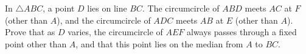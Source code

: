 In $\triangle ABC$, a point $D$ lies on line $BC$.  The circumcircle of $ABD$ meets $AC$ at $F$ (other than $A$), and the circumcircle of $ADC$ meets $AB$ at $E$ (other than $A$).  Prove that as $D$ varies, the circumcircle of $AEF$ always passes through a fixed point other than $A$, and that this point lies on the median from $A$ to $BC$.

